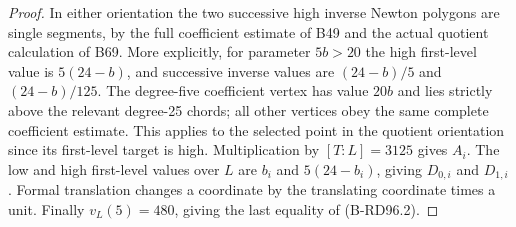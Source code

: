 \begin{proof}
In either orientation the two successive high inverse Newton
polygons are single segments, by the full coefficient estimate
of B49 and the actual quotient calculation of B69. More explicitly,
for parameter $5b>20$ the high first-level value is $5(24-b)$,
and successive inverse values are $(24-b)/5$ and $(24-b)/125$.
The degree-five coefficient vertex has value $20b$ and lies strictly
above the relevant degree-25 chords; all other vertices obey the
same complete coefficient estimate. This applies to the selected
point in the quotient orientation since its first-level target is
high. Multiplication by $[T:L]=3125$ gives $A_i$.
The low and high first-level values over $L$ are $b_i$ and
$5(24-b_i)$, giving $D_{0,i}$ and $D_{1,i}$. Formal translation
changes a coordinate by the translating coordinate times a unit.
Finally $v_L(5)=480$, giving the last equality of (B-RD96.2).
\end{proof}

